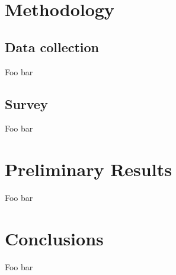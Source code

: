 \documentclass{sig-alternate-10pt}
\begin{document}
\section{Methodology}

\subsection{Data collection}

Foo bar

\subsection{Survey}

Foo bar

\section{Preliminary Results}

Foo bar

\section{Conclusions}

Foo bar

\footnotesize

  
\end{document}
